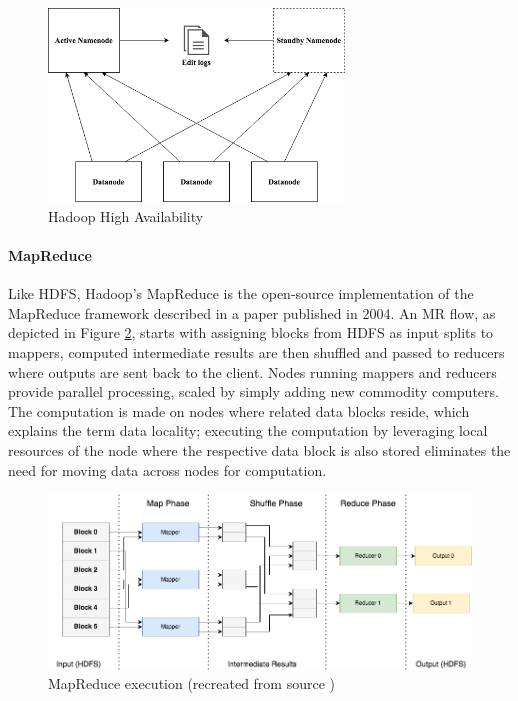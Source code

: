 \documentclass[review]{elsarticle}
\begin{document}
\begin{figure}[h!]
	\caption{Hadoop High Availability}
	\label{fig:HadoopHA}
	\includegraphics[width=0.7\textwidth]{HadoopHA}
	\centering
\end{figure}

\paragraph{MapReduce} 
Like HDFS, Hadoop's MapReduce is the open-source implementation of the MapReduce framework described in a paper \cite{dean_mapreduce_2004} published in 2004. An MR flow, as depicted in Figure \ref{fig:MapReduce}, starts with assigning blocks from HDFS as input splits to mappers, computed intermediate results are then shuffled and passed to reducers where outputs are sent back to the client. Nodes running mappers and reducers provide parallel processing, scaled by simply adding new commodity computers. The computation is made on nodes where related data blocks reside, which explains the term data locality; executing the computation by leveraging local resources of the node where the respective data block is also stored eliminates the need for moving data across nodes for computation.

\begin{figure}[h!]
	\caption{MapReduce execution (recreated from source \cite{schatzle_giant_nodate})}
	\label{fig:MapReduce}
	\includegraphics[width=\textwidth]{MapReduce}
	\centering
\end{figure}
\end{document}
